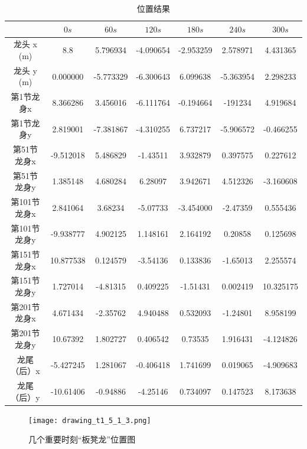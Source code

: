\documentclass{cumcmthesis1}
\begin{document}
\begin{table}[h!]
    \caption{位置结果}
    \centering
    \begin{tabular}{|c|c|c|c|c|c|c|}
    \hline
     & $0s$ & $60s$ & $120s$ & $180s$ & $240s$ & $300s$ \\
    \hline
    龙头 x (m) &8.8&5.796934&-4.090654&-2.953259&2.578971&4.431365 \\
    \hline
    龙头 y (m) & 0.000000 & -5.773329 & -6.300643 & 6.099638 &-5.363954&2.298233 \\
    \hline
     第1节龙身x& 8.366286&3.456016 & -6.111764 &-0.194664 & -191234  & 4.919684 \\
    \hline
     第1节龙身y& 2.819001 & -7.381867 &-4.310255  & 6.737217 & -5.906572&-0.466255  \\
    \hline
     第51节龙身x& -9.512018 & 5.486829 & -1.43511 & 3.932879 & 0.397575 & 0.227612 \\
    \hline
     第51节龙身y& 1.385148&4.680284& 6.28097   & 3.942671 & 4.512326 & -3.160608 \\
    \hline
     第101节龙身x& 2.841064 & 3.68234 & -5.07733 & -3.454000 & -2.47359 & 0.555436 \\
    \hline
     第101节龙身y& -9.938777& 4.902125 & 1.148161& 2.164192 & 0.20858 & 0.125698 \\
    \hline
     第151节龙身x& 10.877538& 0.124579 & -3.54136 & 0.133836 & -1.65013 & 2.255574 \\
    \hline
     第151节龙身y& 1.727014& -4.81315 & 0.409225 & -1.51431 & 0.002419& 10.325175 \\
    \hline
     第201节龙身x& 4.671434 & -2.35762 & 4.940488 & 0.532093 & -1.24801 & 8.958199 \\
    \hline
     第201节龙身y& 10.67392 & 1.802727 & 0.406542 & 0.73535 & 1.916431 & -4.124826 \\
    \hline
     龙尾（后）x& -5.427245 & 1.281067 & -0.406418 & 1.741699 & 0.019065 & -4.909683 \\
    \hline
     龙尾（后）y& -10.61406 & -0.94886 & -4.25146 & 0.734097 & 0.147523 & 8.173638 \\
    \hline
    \end{tabular}
    \label{tab:example}
\end{table}
\begin{figure}
    \caption{几个重要时刻“板凳龙”位置图}
    \centering    
    \texttt{[image: drawing\_t1\_5\_1\_3.png]}
\end{figure}
\end{document}
